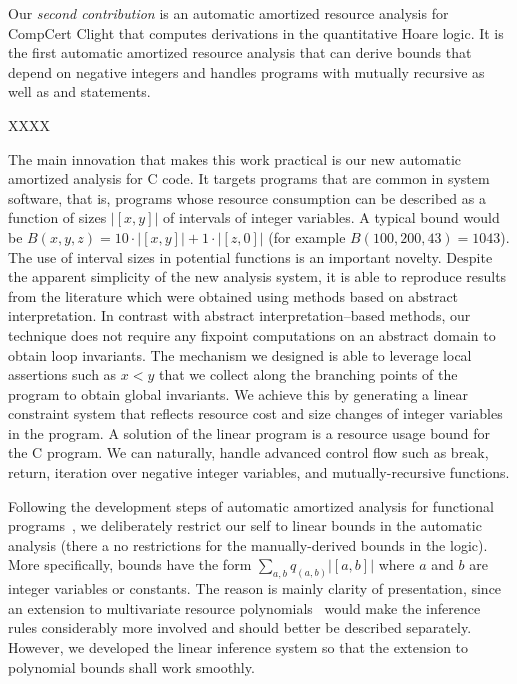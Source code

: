 \documentclass[nocopyrightspace,preprint]{sigplanconf}
\begin{document}
Our \emph{second contribution} is an automatic amortized resource
analysis for CompCert Clight that computes derivations in the
quantitative Hoare logic.  It is the first automatic amortized
resource analysis that can derive bounds that depend on negative
integers and handles programs with mutually recursive as well as
 and  statements.

XXXX

The main innovation that makes this work practical is our new
automatic amortized analysis for C code.  It targets programs that are
common in system software, that is, programs whose resource
consumption can be described as a function of sizes $|[x,y]|$ of
intervals of integer variables.  A typical bound would be $B(x,y,z) =
10{\cdot}|[x,y]| + 1{\cdot}|[z,0]|$ (for example $B(100,200,43) =
1043$).  The use of interval sizes in potential functions is an
important novelty.
%
Despite the apparent simplicity of the new analysis system, it is able
to reproduce results from the literature which were obtained using
methods based on abstract interpretation.  In contrast with abstract
interpretation--based methods, our technique does not require any
fixpoint computations on an abstract domain to obtain loop invariants.
The mechanism we designed is able to leverage local assertions such as
$x < y$ that we collect along the branching points of the program to
obtain global invariants.  We achieve this by generating a linear
constraint system that reflects resource cost and size changes of
integer variables in the program.  A solution of the linear program is
a resource usage bound for the C program.  We can naturally, handle
advanced control flow such as break, return, iteration over negative
integer variables, and mutually-recursive functions.

Following the development steps of automatic amortized analysis for
functional programs~\cite{Jost03,HoffmannH10}, we deliberately
restrict our self to linear bounds in the automatic analysis (there a
no restrictions for the manually-derived bounds in the logic).  More
specifically, bounds have the form $\sum_{a,b} q_{(a,b)} |[a,b]|$
where $a$ and $b$ are integer variables or constants.  The reason is
mainly clarity of presentation, since an extension to multivariate
resource polynomials~\cite{HoffmannAH11} would make the inference rules considerably
more involved and should better be described separately.  However, we
developed the linear inference system so that the extension to
polynomial bounds shall work smoothly.
\end{document}
